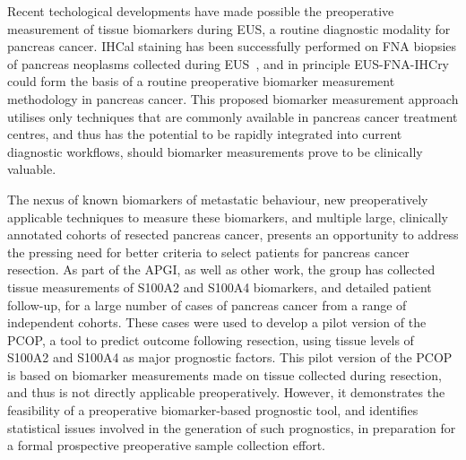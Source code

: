\documentclass[dissertation.tex]{subfiles}
\begin{document}
Recent techological developments have made possible the preoperative measurement of tissue biomarkers during \gls{EUS}, a routine diagnostic modality for pancreas cancer.  \Gls{IHCal} staining has been successfully performed on \gls{FNA} biopsies of pancreas neoplasms collected during \gls{EUS}~\cite{Popescu2012, Salla2009, Stelow2005}, and in principle \gls{EUS}-\gls{FNA}-\acrshort{IHCry} could form the basis of a routine preoperative biomarker measurement methodology in pancreas cancer.  This proposed biomarker measurement approach utilises only techniques that are commonly available in pancreas cancer treatment centres, and thus has the potential to be rapidly integrated into current diagnostic workflows, should biomarker measurements prove to be clinically valuable.

The nexus of known biomarkers of metastatic behaviour, new preoperatively applicable techniques to measure these biomarkers, and multiple large, clinically annotated cohorts of resected pancreas cancer, presents an opportunity to address the pressing need for better criteria to select patients for pancreas cancer resection.  As part of the \gls{APGI}, as well as other work, the group has collected tissue measurements of S100A2 and S100A4 biomarkers, and detailed patient follow-up, for a large number of cases of pancreas cancer from a range of independent cohorts.  These cases were used to develop a pilot version of the \gls{PCOP}, a tool to predict outcome following resection, using tissue levels of S100A2 and S100A4 as major prognostic factors.  This pilot version of the \gls{PCOP} is based on biomarker measurements made on tissue collected during resection, and thus is not directly applicable preoperatively.  However, it demonstrates the feasibility of a preoperative biomarker-based prognostic tool, and identifies statistical issues involved in the generation of such prognostics, in preparation for a formal prospective preoperative sample collection effort.
\end{document}
